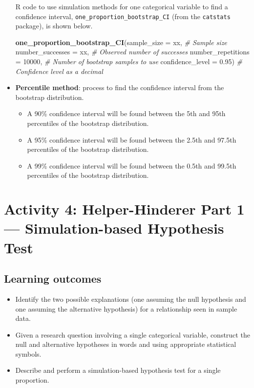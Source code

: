 \documentclass[
]{report}
\newenvironment{Shaded}{\begin{snugshade}}{\end{snugshade}}
\newcommand{\AttributeTok}[1]{\textcolor[rgb]{0.13,0.29,0.53}{#1}}
\newcommand{\CommentTok}[1]{\textcolor[rgb]{0.56,0.35,0.01}{\textit{#1}}}
\newcommand{\DecValTok}[1]{\textcolor[rgb]{0.00,0.00,0.81}{#1}}
\newcommand{\FloatTok}[1]{\textcolor[rgb]{0.00,0.00,0.81}{#1}}
\newcommand{\FunctionTok}[1]{\textcolor[rgb]{0.13,0.29,0.53}{\textbf{#1}}}
\newcommand{\NormalTok}[1]{#1}
\begin{document}
\begin{itemize}
  R code to use simulation methods for one categorical variable to find a confidence interval, \texttt{one\_proportion\_bootstrap\_CI} (from the \texttt{catstats} package), is shown below.

\begin{Shaded}
\begin{Highlighting}[]
\FunctionTok{one\_proportion\_bootstrap\_CI}\NormalTok{(}\AttributeTok{sample\_size =}\NormalTok{ xx, }\CommentTok{\# Sample size}
                \AttributeTok{number\_successes =}\NormalTok{ xx, }\CommentTok{\# Observed number of successes}
                \AttributeTok{number\_repetitions =} \DecValTok{10000}\NormalTok{, }\CommentTok{\# Number of bootstrap samples to use}
                \AttributeTok{confidence\_level =} \FloatTok{0.95}\NormalTok{) }\CommentTok{\# Confidence level as a decimal}
\end{Highlighting}
\end{Shaded}
\item
  \textbf{Percentile method}: process to find the confidence interval from the bootstrap distribution.

  \begin{itemize}
  \item
    A 90\% confidence interval will be found between the 5th and 95th percentiles of the bootstrap distribution.
  \item
    A 95\% confidence interval will be found between the 2.5th and 97.5th percentiles of the bootstrap distribution.
  \item
    A 99\% confidence interval will be found between the 0.5th and 99.5th percentiles of the bootstrap distribution.
  \end{itemize}
\end{itemize}

\newpage

\section{Activity 4: Helper-Hinderer Part 1 --- Simulation-based Hypothesis Test}\label{activity-4-helper-hinderer-part-1-simulation-based-hypothesis-test}


\subsection{Learning outcomes}\label{learning-outcomes-3}

\begin{itemize}
\item
  Identify the two possible explanations (one assuming the null hypothesis and one assuming the alternative hypothesis) for a relationship seen in sample data.
\item
  Given a research question involving a single categorical variable, construct the null and alternative hypotheses
  in words and using appropriate statistical symbols.
\item
  Describe and perform a simulation-based hypothesis test for a single proportion.
\end{itemize}
\end{document}
